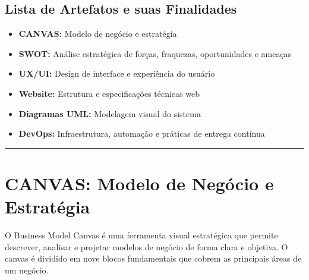 \documentclass[11pt,a4paper]{article}
\begin{document}
\tableofcontents
\newpage

\subsection*{Lista de Artefatos e suas Finalidades}

\begin{itemize}
    \item \textbf{CANVAS:} Modelo de negócio e estratégia
    \item \textbf{SWOT:} Análise estratégica de forças, fraquezas, oportunidades e ameaças
    \item \textbf{UX/UI:} Design de interface e experiência do usuário
    \item \textbf{Website:} Estrutura e especificações técnicas web
    \item \textbf{Diagramas UML:} Modelagem visual do sistema
    \item \textbf{DevOps:} Infraestrutura, automação e práticas de entrega contínua
\end{itemize}

\vspace{0.5cm}
\noindent\rule{\textwidth}{0.5pt}

\newpage

\section{CANVAS: Modelo de Negócio e Estratégia}

O Business Model Canvas \cite{osterwalder2011} é uma ferramenta visual estratégica que permite descrever, analisar e projetar modelos de negócio de forma clara e objetiva. O canvas é dividido em nove blocos fundamentais que cobrem as principais áreas de um negócio.
\end{document}
